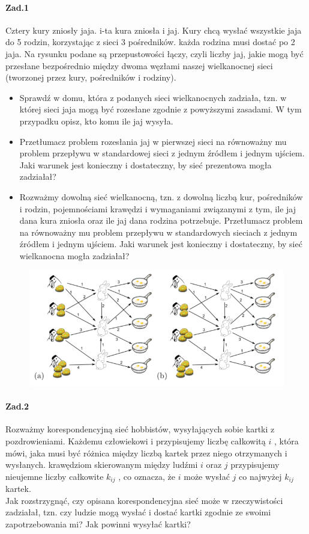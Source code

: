 \paragraph{Zad.1} Cztery kury zniosły jaja. i-ta kura zniosła i jaj. Kury chcą wysłać wszystkie jaja do 5 rodzin, korzystając z sieci 3 pośredników. każda rodzina musi dostać po 2 jaja. Na rysunku podane są przepustowości łączy, czyli liczby jaj, jakie mogą być przesłane bezpośrednio między dwoma węzłami naszej wielkanocnej sieci (tworzonej przez kury, pośredników i rodziny). 
\begin{itemize}
\item Sprawdź w domu, która z podanych sieci wielkanocnych zadziała, tzn. w której sieci jaja mogą być rozesłane zgodnie z powyższymi zasadami. W tym przypadku opisz, kto komu ile jaj wysyła.
\item Przetłumacz problem rozesłania jaj w pierwszej sieci na równoważny mu problem przepływu w standardowej sieci z jednym źródłem i jednym ujściem. Jaki warunek jest konieczny i dostateczny, by sieć prezentowa mogła zadziałał?
\item Rozważmy dowolną sieć wielkanocną, tzn. z dowolną liczbą kur, pośredników i rodzin, pojemnościami krawędzi i wymaganiami związanymi z tym, ile jaj dana kura zniosła oraz ile jaj dana rodzina potrzebuje. Przetłumacz problem na równoważny mu problem przepływu w standardowych sieciach z jednym źródłem i jednym ujściem. Jaki warunek jest konieczny i dostateczny, by sieć wielkanocna mogła zadziałał?
\end{itemize}
\begin{figure}
\centering
\includegraphics[width=.8\textwidth]{img/7_Z1}
\end{figure}


\paragraph{Zad.2} Rozważmy korespondencyjną sieć hobbistów, wysyłających sobie kartki z pozdrowieniami. Każdemu człowiekowi i przypisujemy liczbę całkowitą $i$ , która mówi, jaka musi być różnica między liczbą kartek przez niego otrzymanych i wysłanych. krawędziom skierowanym między ludźmi $i$ oraz $j$ przypisujemy nieujemne liczby całkowite $k_{ij}$ , co oznacza, że $i$ może wysłać $j$ co najwyżej $k_{ij}$ kartek.\\
Jak rozstrzygnąć, czy opisana korespondencyjna sieć może w rzeczywistości zadziałał, tzn. czy ludzie mogą wysłać i dostać kartki zgodnie ze swoimi zapotrzebowania mi? Jak powinni wysyłać kartki?

